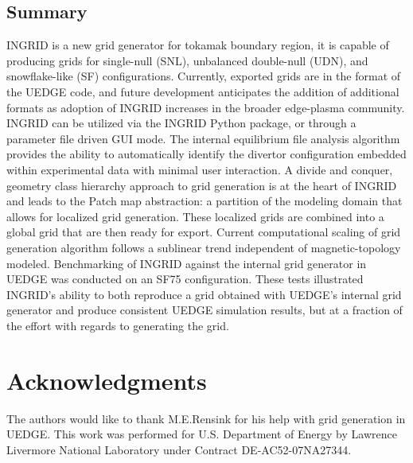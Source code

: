 \subsection{\label{sec:level2}Summary}
INGRID is a new grid generator for tokamak boundary region, it is
capable of producing grids for single-null (SNL), unbalanced
double-null (UDN), and snowflake-like (SF) configurations. Currently,
exported grids are in the format of the UEDGE code, and future
development anticipates the addition of additional formats as adoption
of INGRID increases in the broader edge-plasma community. INGRID can
be utilized via the INGRID Python package, or through a parameter file
driven GUI mode. The internal equilibrium file analysis algorithm
provides the ability to automatically identify the divertor
configuration embedded within experimental data with minimal user
interaction. A divide and conquer, geometry class hierarchy approach
to grid generation is at the heart of INGRID and leads to the Patch
map abstraction: a partition of the modeling domain that allows for
localized grid generation. These localized grids are combined into a
global grid that are then ready for export. Current computational
scaling of grid generation algorithm follows a sublinear trend
independent of magnetic-topology modeled. Benchmarking of INGRID
against the internal grid generator in UEDGE was conducted on an SF75
configuration. These tests illustrated INGRID's ability to both
reproduce a grid obtained with UEDGE's internal grid generator and
produce consistent UEDGE simulation results, but at a fraction of the
effort with regards to generating the grid.

\section{Acknowledgments}
The authors would like to thank M.E.Rensink for his help with grid
generation in UEDGE. This work was performed for U.S. Department of
Energy by Lawrence Livermore National Laboratory under Contract
DE-AC52-07NA27344.
